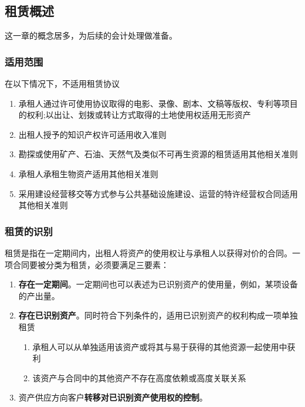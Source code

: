 \documentclass[UTF8,12pt]{ctexart}
\numberwithin{equation}{section} %
\numberwithin{figure}{section}
\numberwithin{table}{section}
\begin{document}
	\subsection{租赁概述}
	这一章的概念居多，为后续的会计处理做准备。
	\subsubsection{适用范围}
	在以下情况下，不适用租赁协议
	\begin{enumerate}
		\item 承租人通过许可使用协议取得的电影、录像、剧本、文稿等版权、专利等项目的权利;以出让、划拨或转让方式取得的土地使用权适用无形资产
		
		\item 出租人授予的知识产权许可适用收入准则
		
		\item 勘探或使用矿产、石油、天然气及类似不可再生资源的租赁适用其他相关准则
		
		\item 承租人承租生物资产适用其他相关准则
		
		\item 采用建设经营移交等方式参与公共基础设施建设、运营的特许经营权合同适用其他相关准则
	\end{enumerate}
	
	\subsubsection{租赁的识别}
	租赁是指在一定期间内，出租人将资产的使用权让与承租人以获得对价的合同。一项合同要被分类为租赁，必须要满足三要素：
	\begin{enumerate}
		\item \textbf{存在一定期间}。一定期间也可以表述为已识别资产的使用量，例如，某项设备的产出量。
		
		\item \textbf{存在已识别资产}。同时符合下列条件的，适用已识别资产的权利构成一项单独租赁
		\begin{enumerate}
			\item 承租人可以从单独适用该资产或将其与易于获得的其他资源一起使用中获利
			
			\item 该资产与合同中的其他资产不存在高度依赖或高度关联关系
		\end{enumerate}
		
		\item 资产供应方向客户\textbf{转移对已识别资产使用权的控制}。
	\end{enumerate}
	
\end{document}
